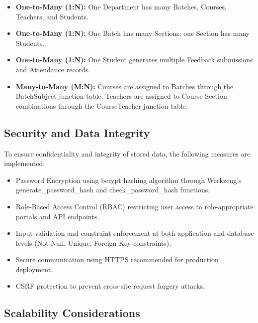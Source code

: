 \begin{itemize}
    \item \textbf{One-to-Many (1:N):} One Department has many Batches, Courses, Teachers, and Students.
    \item \textbf{One-to-Many (1:N):} One Batch has many Sections; one Section has many Students.
    \item \textbf{One-to-Many (1:N):} One Student generates multiple Feedback submissions and Attendance records.
    \item \textbf{Many-to-Many (M:N):} Courses are assigned to Batches through the BatchSubject junction table. Teachers are assigned to Course-Section combinations through the CourseTeacher junction table.
\end{itemize}



\subsection{Security and Data Integrity}

To ensure confidentiality and integrity of stored data, the following measures are implemented:

\begin{itemize}
    \item Password Encryption using bcrypt hashing algorithm through Werkzeug's generate\_password\_hash and check\_password\_hash functions.
    \item Role-Based Access Control (RBAC) restricting user access to role-appropriate portals and API endpoints.
    \item Input validation and constraint enforcement at both application and database levels (Not Null, Unique, Foreign Key constraints).
    \item Secure communication using HTTPS recommended for production deployment.
    \item CSRF protection to prevent cross-site request forgery attacks.
\end{itemize}



\subsection{Scalability Considerations}

